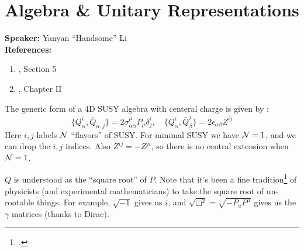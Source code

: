 \documentclass[a4paper
	,10pt
]{article}
\newcommand{\speaker}[1]{\noindent\textbf{Speaker:} #1}
\newcommand{\references}[1]{\noindent\textbf{References:} #1}
\begin{document}
\section{Algebra \& Unitary Representations}
	\speaker{Yanyan ``Handsome'' Li}\\
	\references{
	\begin{enumerate}[noitemsep,topsep=0pt]
	\item \textcite{Argyres:1996abc}, Section 5
	\item \textcite{Wess:1992cp}, Chapter II
	\end{enumerate}
	}\vspace{.5\baselineskip}
	
	The generic form of a 4D SUSY algebra with centeral charge is given by \cite{Wess:1992cp}:
	\begin{equation}
		\{ Q^i_\alpha, \bar{Q}_{\dot{\alpha},j} \}
		= 2\sigma^\mu_{\alpha\dot{\alpha}} P_\mu
			\delta^i_j,
	\quad
		\{ Q^i_\alpha, \bar{Q}^j_{\beta} \}
		= 2\epsilon_{\alpha\beta} Z^{ij}
	\end{equation}
	Here $i,j$ labels $\mathcal{N}$ ``flavors'' of SUSY. For minimal SUSY we have $\mathcal{N} = 1$, and we can drop the $i,j$ indices. Also $Z^{ij} = -Z^{ji}$, so there is no central extension when $\mathcal{N} = 1$. 
	
	$Q$ is understood as the ``square root'' of $P$. 
	Note that it's been a fine tradition\footnote{
		.
	} of physicists (and experimental mathematicians) to take the square root of un-rootable things. For example, $\sqrt{-1}$ gives us $i$, and $\sqrt{\Box^2} = \sqrt{-P_u P^\mu}$ gives us the $\gamma$ matrices (thanks to Dirac). 
	
\end{document}

